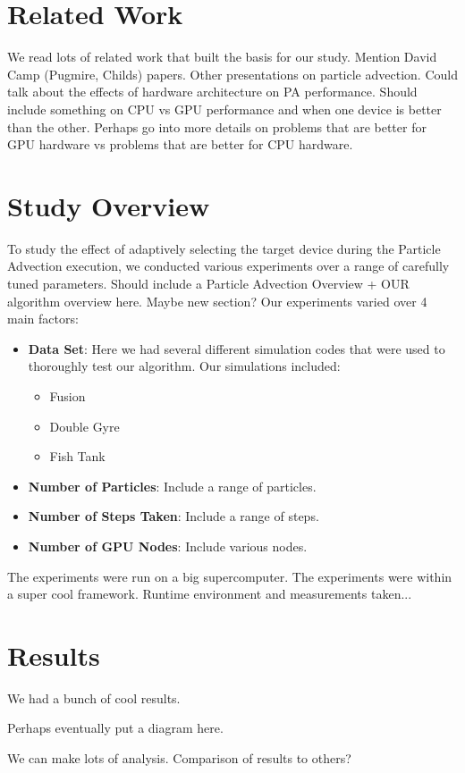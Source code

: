 \documentclass{IEEEtran}
\begin{document}
\section{Related Work}
We read lots of related work that built the basis for our study.
%
Mention David Camp (Pugmire, Childs) papers.
%
Other presentations on particle advection.
%
Could talk about the effects of hardware architecture on PA performance.
%
Should include something on CPU vs GPU performance and when one device is better than the other.
%
Perhaps go into more details on problems that are better for GPU hardware vs problems that are better for CPU hardware.
%
\section{Study Overview}
To study the effect of adaptively selecting the target device during the Particle Advection execution, we conducted various experiments over a range of carefully tuned parameters.
%
Should include a Particle Advection Overview + OUR algorithm overview here. Maybe new section?
%
Our experiments varied over 4 main factors:
%
\begin{itemize}
\item \textbf{Data Set}: Here we had several different simulation codes that were used to thoroughly test our algorithm. Our simulations included:
%
\begin{itemize}
\item{Fusion}
\item{Double Gyre}
\item{Fish Tank}
\end{itemize}
%
\item \textbf{Number of Particles}: Include a range of particles.
\item \textbf{Number of Steps Taken}: Include a range of steps.
\item \textbf{Number of GPU Nodes}: Include various nodes.
\end{itemize}
%
The experiments were run on a big supercomputer. 
%
The experiments were within a super cool framework.
%
Runtime environment and measurements taken...
%
\section{Results}
We had a bunch of cool results.
\begin{center}
 Perhaps eventually put a diagram here.
\end{center}
We can make lots of analysis.
%
Comparison of results to others? 
%
\end{document}
